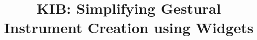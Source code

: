 \documentclass{nime-alternate}
\begin{document}
%

\title{KIB: Simplifying Gestural Instrument Creation using Widgets}

%
%
%
%
%
\end{document}
